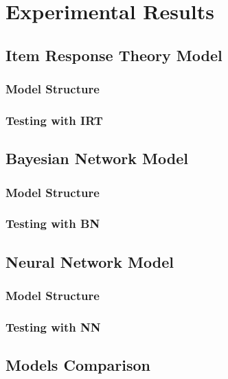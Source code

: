 \chapter{Experimental Results}
\section{Item Response Theory Model}
\subsection{Model Structure}
\subsection{Testing with IRT}
 
\section{Bayesian Network Model}
\subsection{Model Structure}

\subsection{Testing with BN}

\section{Neural Network Model}
\subsection{Model Structure}
\subsection{Testing with NN}

\section{Models Comparison}